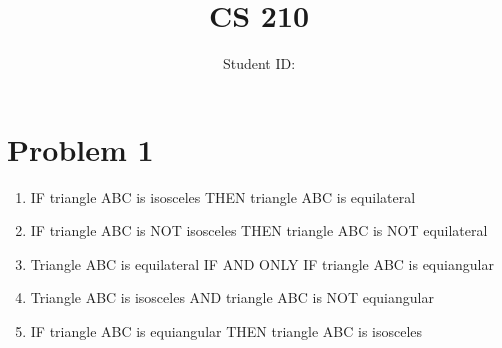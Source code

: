 \documentclass{article}
\title{CS 210 \hwNo}
\author{\myname \qquad Student ID: \myid}
\date{\currentdate}
\begin{document}
\maketitle

\section*{Problem 1}
\begin{enumerate}
    \item %
    IF triangle ABC is isosceles THEN triangle ABC is equilateral
    
    \item %
    IF triangle ABC is NOT isosceles THEN triangle ABC is NOT equilateral
    
    \item %
    Triangle ABC is equilateral IF AND ONLY IF triangle ABC is equiangular

    \item %
    Triangle ABC is isosceles AND triangle ABC is NOT equiangular

    \item %
    IF triangle ABC is equiangular THEN triangle ABC is isosceles

\end{enumerate}
\end{document}
